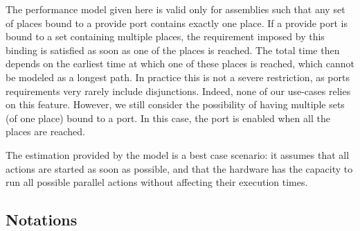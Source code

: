 The performance model given here is valid only for assemblies such
that any set of places bound to a provide port contains exactly one
place. If a provide port is bound to a set containing multiple
places, the requirement imposed by this binding is satisfied as soon
as one of the places is reached. The total time then depends on the
earliest time at which one of these places is reached, which cannot be
modeled as a longest path. In practice this is not a severe
restriction, as ports requirements very rarely include
disjunctions. Indeed, none of our use-cases relies on this
feature. However, we still consider the possibility of having multiple
sets (of one place) bound to a port. In this case, the port is enabled
when all the places are reached.


The estimation provided by the model is a best case scenario: it
assumes that all actions are started as soon as possible, and that the
hardware has the capacity to run all possible parallel actions without
affecting their execution times.

\subsection{Notations}



